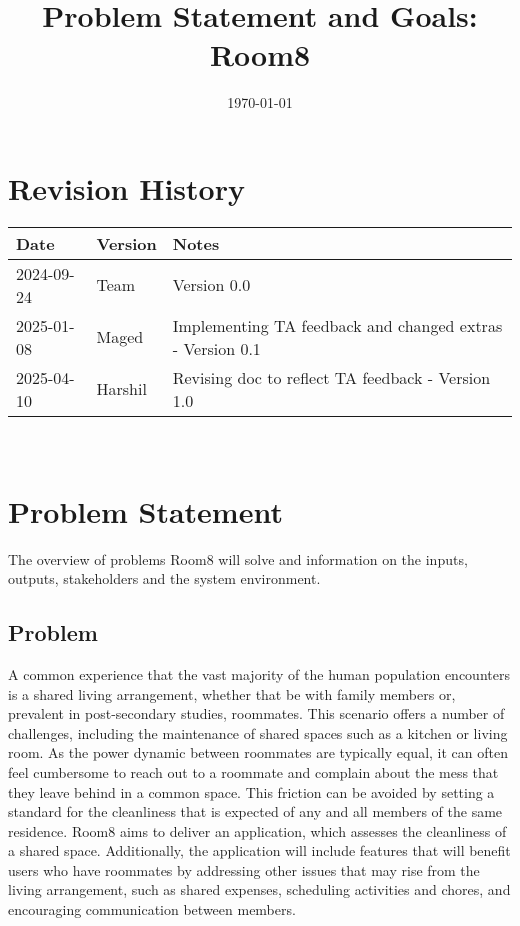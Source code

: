 \documentclass[12pt, titlepage]{article}
\begin{document}
\title{Problem Statement and Goals: Room8} 
\author{\authname}
\date{\today}
	
\maketitle



\section{Revision History}

\begin{tabularx}{\textwidth}{p{3cm}p{2cm}X}
\toprule {\bf Date} & {\bf Version} & {\bf Notes}\\
\midrule
2024-09-24 & Team & Version 0.0 \\
2025-01-08 & Maged & Implementing TA feedback and changed extras - Version 0.1\\
2025-04-10 & Harshil & Revising doc to reflect TA feedback - Version 1.0\\
\bottomrule
\end{tabularx}

~\newpage


\section{Problem Statement}
The overview of problems Room8 will solve and information on the inputs, outputs, stakeholders and the system environment.
\subsection{Problem}
A common experience that the vast majority of the human population encounters is a shared living arrangement, whether that be with family members or, prevalent in post-secondary studies, roommates. This scenario offers a number of challenges, including the maintenance of shared spaces such as a kitchen or living room. As the power dynamic between roommates are typically equal, it can often feel cumbersome to reach out to a roommate and complain about the mess that they leave behind in a common space. This friction can be avoided by setting a standard for the cleanliness that is expected of any and all members of the same residence. Room8 aims to deliver an application, which assesses the cleanliness of a shared space. Additionally, the application will include features that will benefit users who have roommates by addressing other issues that may rise from the living arrangement, such as shared expenses, scheduling activities and chores, and encouraging communication between members.
\end{document}
